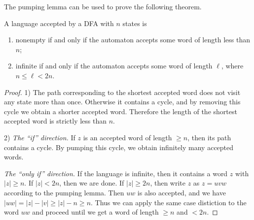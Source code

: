 \begin{page}
\setcounter{section}{3}
\setcounter{subsection}{2}
\setcounter{dfn}{6}
\label{portion:1005}



The pumping lemma can be used to prove the following theorem.


\end{page}

\begin{page}
\setcounter{section}{3}
\setcounter{subsection}{2}
\setcounter{dfn}{7}
\label{portion:1007}

\begin{thm}
A language accepted by a DFA with $n$ states is
\begin{enumerate}
\item
nonempty if and only if the automaton accepts some word of length less than $n$;
\item
infinite if and only if the automaton accepts some word of length $\ell$, where $n \le \ell < 2n$.
\end{enumerate}
\end{thm}

\end{page}

\begin{page}
\setcounter{section}{3}
\setcounter{subsection}{3}
\setcounter{dfn}{7}
\label{portion:1008}

\begin{proof}
1) The path corresponding to the shortest accepted word does not visit any state more than once.
Otherwise it contains a cycle, and by removing this cycle we obtain a shorter accepted word.
Therefore the length of the shortest accepted word is strictly less than $n$.

2) \emph{The ``if'' direction.} If $z$ is an accepted word of length $\ge n$, then its path contains a cycle.
By pumping this cycle, we obtain infinitely many accepted words.

\emph{The ``only if'' direction.} If the language is infinite, then it contains a word $z$ with $|z| \ge n$.
If $|z| < 2n$, then we are done.
If $|z| \ge 2n$, then write $z$ as $z = uvw$ according to the pumping lemma.
Then $uw$ is also accepted, and we have $|uw| = |z| - |v| \ge |z| - n \ge n$.
Thus we can apply the same case distiction to the word $uw$ and proceed until we get a word of length $\ge n$ and $< 2n$.
\end{proof}




\end{page}

